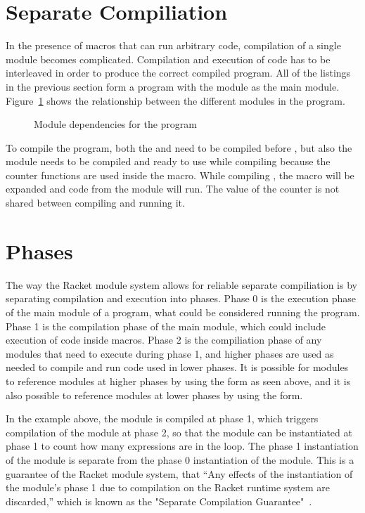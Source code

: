 \section{Separate Compiliation}
In the presence of macros that can run arbitrary code, compilation of a single module becomes complicated. 
Compilation and execution of code has to be interleaved in order to produce the correct compiled program.
All of the listings in the previous section form a program with the  module as the main module.
Figure~\ref{fig:modules.tex} shows the relationship between the different modules in the program.
\begin{figure}
  
  \caption{Module dependencies for the  program}
  \label{fig:modules.tex}
\end{figure}
To compile the program, both the  and  need to be compiled before , but also the  module needs to be compiled and ready to use while compiling  because the counter functions are used inside the  macro.
While compiling , the  macro will be expanded and code from the  module will run.
The value of the counter is not shared between compiling  and running it.

\section{Phases}
The way the Racket module system allows for reliable separate compiliation is by separating compilation and execution into phases.
Phase 0 is the execution phase of the main module of a program, what could be considered running the program.
Phase 1 is the compilation phase of the main module, which could include execution of code inside macros. 
Phase 2 is the compiliation phase of any modules that need to execute during phase 1, and higher phases are used as needed to compile and run code used in lower phases.
It is possible for modules to reference modules at higher phases by using the  form as seen above, and it is also possible to reference modules at lower phases by using the  form.

In the example above, the  module is compiled at phase 1, which triggers compilation of the  module at phase 2, so that the  module can be instantiated at phase 1 to count how many expressions are in the  loop.
The phase 1 instantiation of the  module is separate from the phase 0 instantiation of the module.
This is a guarantee of the Racket module system, that ``Any effects of the instantiation of the module's phase 1 due to compilation on the Racket runtime system are discarded,'' which is known as the "Separate Compilation Guarantee"~\cite{sep}.

